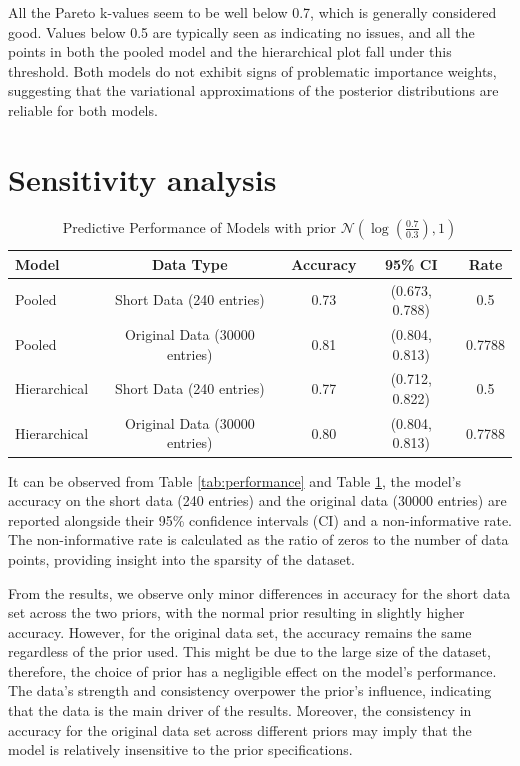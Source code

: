 \documentclass[a4paper]{artikel3}
\begin{document}
All the Pareto k-values seem to be well below 0.7, which is generally considered good. Values below 0.5 are typically seen as indicating no issues, and all the points in both the pooled model and the hierarchical plot fall under this threshold. Both models do not exhibit signs of problematic importance weights, suggesting that the variational approximations of the posterior distributions are reliable for both models.

\section{Sensitivity analysis}
\begin{table}[h!]
  \centering
  \caption{Predictive Performance of Models with prior $\mathcal{N}(\log(\frac{0.7}{0.3}), 1)$}
  \label{tab:performance_log}
  \begin{tabular}{lcccc}
    \toprule
    \textbf{Model} & \textbf{Data Type} & \textbf{Accuracy} & \textbf{95\% CI} & \textbf{Rate} \\
    \midrule
    Pooled & Short Data (240 entries) & 0.73 & (0.673, 0.788) & 0.5 \\
    Pooled & Original Data (30000 entries) & 0.81 & (0.804, 0.813) & 0.7788 \\
    \addlinespace
    Hierarchical & Short Data (240 entries) & 0.77 & (0.712, 0.822) & 0.5 \\
    Hierarchical  & Original Data (30000 entries) & 0.80 & (0.804, 0.813) & 0.7788 \\
    \bottomrule
  \end{tabular}
\end{table}

It can be observed from Table \ref{tab:performance} and Table \ref{tab:performance_log}, the model's accuracy on the short data (240 entries) and the original data (30000 entries) are reported alongside their 95\% confidence intervals (CI) and a non-informative rate. The non-informative rate is calculated as the ratio of zeros to the number of data points, providing insight into the sparsity of the dataset.

From the results, we observe only minor differences in accuracy for the short data set across the two priors, with the normal prior resulting in slightly higher accuracy. However, for the original data set, the accuracy remains the same regardless of the prior used. This might be due to the large size of the dataset, therefore, the choice of prior has a negligible effect on the model's performance. The data's strength and consistency overpower the prior's influence, indicating that the data is the main driver of the results. Moreover, the consistency in accuracy for the original data set across different priors may imply that the model is relatively insensitive to the prior specifications. 
\end{document}
